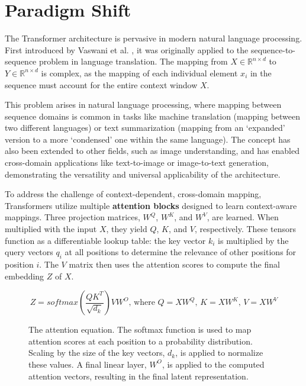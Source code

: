 \section{Paradigm Shift}

The Transformer architecture is pervasive in modern natural language processing. First introduced by Vaswani et al. \cite{DBLP:journals/corr/VaswaniSPUJGKP17}, it was originally applied to the sequence-to-sequence problem in language translation. The mapping from $X \in \mathbb{R}^{n \times d}$ to $Y \in \mathbb{R}^{n \times d}$ is complex, as the mapping of each individual element $x_i$ in the sequence must account for the entire context window $X$.

\vskip 0.2in

This problem arises in natural language processing, where mapping between sequence domains is common in tasks like machine translation (mapping between two different languages) or text summarization (mapping from an ‘expanded’ version to a more ‘condensed’ one within the same language). The concept has also been extended to other fields, such as image understanding, and has enabled cross-domain applications like text-to-image or image-to-text generation, demonstrating the versatility and universal applicability of the architecture.

\vskip 0.2in

To address the challenge of context-dependent, cross-domain mapping, Transformers utilize multiple \textbf{attention blocks} designed to learn context-aware mappings. Three projection matrices, $W^Q$, $W^K$, and $W^V$, are learned. When multiplied with the input $X$, they yield $Q$, $K$, and $V$, respectively. These tensors function as a differentiable lookup table: the key vector $k_i$ is multiplied by the query vectors $q_i$ at all positions to determine the relevance of other positions for position $i$. The $V$ matrix then uses the attention scores to compute the final embedding $Z$ of $X$.

\begin{figure}[h]
\[ Z = softmax(\frac{QK^T}{\sqrt{d_k}})VW^O \text{, where } Q = XW^Q\text{, }K = XW^K\text{, } V = XW^V \]
\caption[Attention Equation]{The attention equation. The softmax function is used to map attention scores at each position to a probability distribution. Scaling by the size of the key vectors, $d_k$, is applied to normalize these values. A final linear layer, $W^O$, is applied to the computed attention vectors, resulting in the final latent representation.}
\end{figure}


